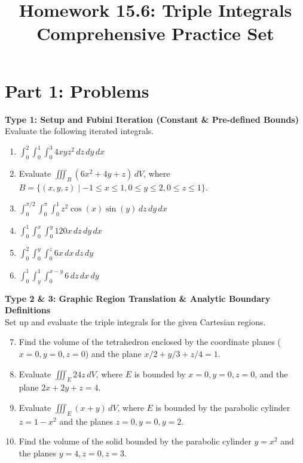 \documentclass[11pt]{article}
\begin{document}
\title{\textbf{Homework 15.6: Triple Integrals \\ Comprehensive Practice Set}}
\date{}
\maketitle

\section*{Part 1: Problems}

\textbf{Type 1: Setup and Fubini Iteration (Constant \& Pre-defined Bounds)} \\
Evaluate the following iterated integrals.
\begin{enumerate}
    \item $\displaystyle \int_0^2 \int_0^1 \int_0^3 4xyz^2 \,dz\,dy\,dx$
    \item Evaluate $\displaystyle \iiint_B (6x^2 + 4y + z) \,dV$, where $B = \{(x,y,z) \mid -1 \le x \le 1, 0 \le y \le 2, 0 \le z \le 1\}$.
    \item $\displaystyle \int_0^{\pi/2} \int_0^{\pi} \int_0^1 z^2 \cos(x) \sin(y) \,dz\,dy\,dx$
    \item $\displaystyle \int_0^1 \int_0^x \int_0^{y} 120 x \,dz\,dy\,dx$
    \item $\displaystyle \int_0^2 \int_0^y \int_0^z 6x \,dx\,dz\,dy$
    \item $\displaystyle \int_0^1 \int_y^1 \int_0^{x-y} 6 \,dz\,dx\,dy$
\end{enumerate}

\textbf{Type 2 \& 3: Graphic Region Translation \& Analytic Boundary Definitions} \\
Set up and evaluate the triple integrals for the given Cartesian regions.
\begin{enumerate}
\setcounter{enumi}{6}
    \item Find the volume of the tetrahedron enclosed by the coordinate planes ($x=0, y=0, z=0$) and the plane $x/2 + y/3 + z/4 = 1$.
    \item Evaluate $\displaystyle \iiint_E 24z \,dV$, where $E$ is bounded by $x=0, y=0, z=0$, and the plane $2x + 2y + z = 4$.
    \item Evaluate $\displaystyle \iiint_E (x+y) \,dV$, where $E$ is bounded by the parabolic cylinder $z = 1 - x^2$ and the planes $z=0, y=0, y=2$.
    \item Find the volume of the solid bounded by the parabolic cylinder $y = x^2$ and the planes $y=4, z=0, z=3$.
\end{enumerate}
\end{document}
